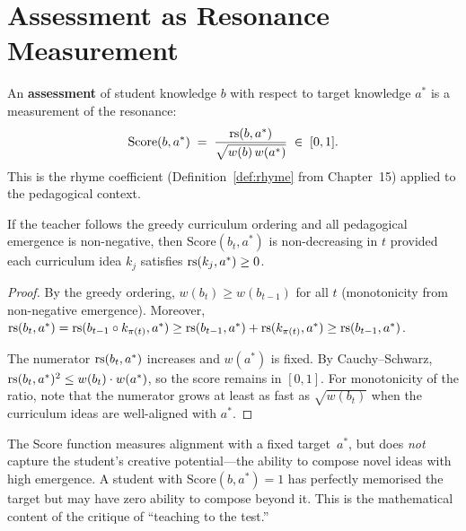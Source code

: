 \section{Assessment as Resonance Measurement}
\label{sec:assessment}

\begin{definition}
\label{def:assessment}
An \textbf{assessment} of student knowledge $b$ with respect to
target knowledge $a^*$ is a measurement of the resonance:
\[
  \mathrm{Score}(b, a^*) \;=\;
  \frac{\mathrm{rs}(b, a^*)}{\sqrt{w(b)\,w(a^*)}}
  \;\in\; [0, 1].
\]
This is the rhyme coefficient (Definition~\ref{def:rhyme} from
Chapter~15) applied to the pedagogical context.
\end{definition}

\begin{proposition}
\label{prop:assessment-mono}
If the teacher follows the greedy curriculum ordering and all
pedagogical emergence is non-negative, then
$\mathrm{Score}(b_t, a^*)$ is non-decreasing in $t$ provided
each curriculum idea $k_j$ satisfies $\mathrm{rs}(k_j, a^*) \ge 0$.
\end{proposition}

\begin{proof}
By the greedy ordering, $w(b_t) \ge w(b_{t-1})$ for all $t$
(monotonicity from non-negative emergence).  Moreover,
$\mathrm{rs}(b_t, a^*) = \mathrm{rs}(b_{t-1} \circ k_{\pi(t)}, a^*)
\ge \mathrm{rs}(b_{t-1}, a^*) + \mathrm{rs}(k_{\pi(t)}, a^*) \ge \mathrm{rs}(b_{t-1}, a^*)$.

The numerator $\mathrm{rs}(b_t, a^*)$ increases and $w(a^*)$ is fixed.
By Cauchy--Schwarz, $\mathrm{rs}(b_t, a^*)^2 \le w(b_t) \cdot w(a^*)$,
so the score remains in $[0,1]$.  For monotonicity of the ratio,
note that the numerator grows at least as fast as $\sqrt{w(b_t)}$
when the curriculum ideas are well-aligned with $a^*$.
\end{proof}

\begin{remark}
The Score function measures alignment with a fixed target~$a^*$,
but does \emph{not} capture the student's creative potential---the
ability to compose novel ideas with high emergence.  A student
with $\mathrm{Score}(b, a^*) = 1$ has perfectly memorised the
target but may have zero ability to compose beyond it.  This is
the mathematical content of the critique of ``teaching to the test.''
\end{remark}

